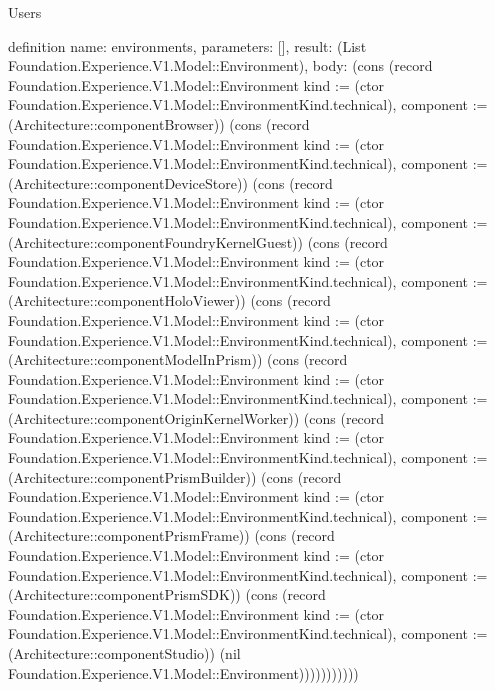\begin{lexlean}{Users}
\begin{semanticmodule}
definition{
  name: environments,
  parameters: [],
  result: (List Foundation.Experience.V1.Model::Environment),
  body: (cons (record Foundation.Experience.V1.Model::Environment {kind := (ctor Foundation.Experience.V1.Model::EnvironmentKind.technical), component := (Architecture::componentBrowser)}) (cons (record Foundation.Experience.V1.Model::Environment {kind := (ctor Foundation.Experience.V1.Model::EnvironmentKind.technical), component := (Architecture::componentDeviceStore)}) (cons (record Foundation.Experience.V1.Model::Environment {kind := (ctor Foundation.Experience.V1.Model::EnvironmentKind.technical), component := (Architecture::componentFoundryKernelGuest)}) (cons (record Foundation.Experience.V1.Model::Environment {kind := (ctor Foundation.Experience.V1.Model::EnvironmentKind.technical), component := (Architecture::componentHoloViewer)}) (cons (record Foundation.Experience.V1.Model::Environment {kind := (ctor Foundation.Experience.V1.Model::EnvironmentKind.technical), component := (Architecture::componentModelInPrism)}) (cons (record Foundation.Experience.V1.Model::Environment {kind := (ctor Foundation.Experience.V1.Model::EnvironmentKind.technical), component := (Architecture::componentOriginKernelWorker)}) (cons (record Foundation.Experience.V1.Model::Environment {kind := (ctor Foundation.Experience.V1.Model::EnvironmentKind.technical), component := (Architecture::componentPrismBuilder)}) (cons (record Foundation.Experience.V1.Model::Environment {kind := (ctor Foundation.Experience.V1.Model::EnvironmentKind.technical), component := (Architecture::componentPrismFrame)}) (cons (record Foundation.Experience.V1.Model::Environment {kind := (ctor Foundation.Experience.V1.Model::EnvironmentKind.technical), component := (Architecture::componentPrismSDK)}) (cons (record Foundation.Experience.V1.Model::Environment {kind := (ctor Foundation.Experience.V1.Model::EnvironmentKind.technical), component := (Architecture::componentStudio)}) (nil Foundation.Experience.V1.Model::Environment)))))))))))
}


\end{semanticmodule}
\end{lexlean}
